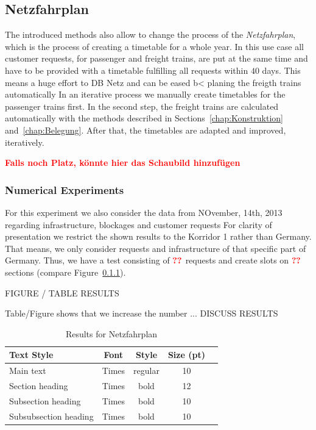 \subsection{Netzfahrplan}
\label{chap:Netzfahrplan}
The introduced methods also allow to change the process of the \emph{Netzfahrplan}, which is the process of creating a timetable for a whole year. In this use case all customer requests, for passenger and freight trains, are put at the same time and have to be provided with a timetable fulfilling all requests within $40$ days. This means a huge effort to DB Netz and can be eased b< planing the freigth trains automatically In an iterative process we manually create timetables for the passenger trains first. In the second step, the freight trains are calculated automatically with the methods described in Sections~\ref{chap:Konstruktion} and~\ref{chap:Belegung}. After that, the timetables are adapted and improved, iteratively.

\textbf{\textcolor{red}{Falls noch Platz, könnte hier das Schaubild hinzufügen}}

\subsubsection{Numerical Experiments}
For this experiment we also consider the data from NOvember, 14th, 2013 regarding infrastructure, blockages and customer requests For clarity of presentation we restrict the shown results to the Korridor 1 \cite{} rather than Germany. That means, we only consider requests and infrastructure of that specific part of Germany. Thus, we have a test consisting of $\textbf{\textcolor{red}{??}}$ requests and create slots on $\textbf{\textcolor{red}{??}}$ sections (compare Figure~\ref{}).

FIGURE / TABLE RESULTS

Table/Figure shows that we increase the number ... DISCUSS RESULTS
%
\begin{table}[h]
	\centering
	\caption{Results for Netzfahrplan}
	\label{tab:result_Netzfpl}
	\begin{tabular}{lcccc} \hline
		\textbf{Text Style}   & \textbf{Font} & \textbf{Style} & \textbf{Size (pt)} \\ \hline
		Main text             & Times         & regular        & 10                 \\
		Section heading       & Times         & bold           & 12                 \\
		Subsection heading    & Times         & bold           & 10                 \\
		Subsubsection heading & Times         & bold           & 10                 \\ \hline
	\end{tabular}
\end{table}
\par


